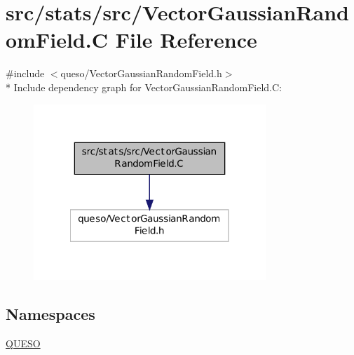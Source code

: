 \hypertarget{_vector_gaussian_random_field_8_c}{\section{src/stats/src/\-Vector\-Gaussian\-Random\-Field.C File Reference}
\label{_vector_gaussian_random_field_8_c}
}
{\ttfamily \#include $<$queso/\-Vector\-Gaussian\-Random\-Field.\-h$>$}\\*
Include dependency graph for Vector\-Gaussian\-Random\-Field.\-C\-:
\nopagebreak
\begin{figure}[H]
\begin{center}
\leavevmode
\includegraphics[width=248pt]{_vector_gaussian_random_field_8_c__incl}
\end{center}
\end{figure}
\subsection*{Namespaces}
\begin{DoxyCompactItemize}
\item 
\hyperlink{namespace_q_u_e_s_o}{Q\-U\-E\-S\-O}
\end{DoxyCompactItemize}
